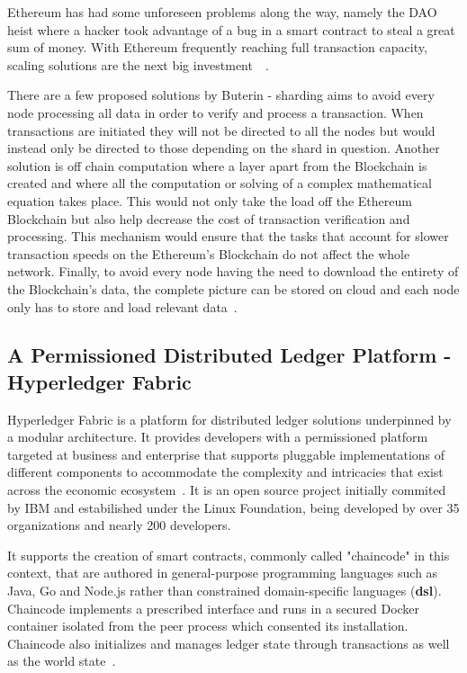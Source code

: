Ethereum has had some unforeseen problems along the way, namely the DAO heist where a hacker took advantage of a bug in a smart contract to steal a great sum of money. With Ethereum frequently reaching full transaction capacity, scaling solutions are the next big investment~~\cite{ethereumScalability2018}.

 There are a few proposed solutions by Buterin - sharding aims to avoid every node processing all data in order to verify and process a transaction. When transactions are initiated they will not be directed to all the nodes but would instead only be directed to those depending on the shard in question. Another solution is off chain computation where a layer apart from the Blockchain is created and where all the computation or solving of a complex mathematical equation takes place. This would not only take the load off the Ethereum Blockchain but also help decrease the cost of transaction verification and processing. This mechanism would ensure that the tasks that account for slower transaction speeds on the Ethereum’s Blockchain do not affect the whole network. Finally, to avoid every node having the need to download the entirety of the Blockchain's data, the complete picture can be stored on cloud and each node only has to store and load relevant data~\cite{ethereumBlogScalability2018}.

\subsection{A Permissioned Distributed Ledger Platform - Hyperledger Fabric}

Hyperledger Fabric is a platform for distributed ledger solutions underpinned by a modular architecture. It provides developers with a permissioned platform targeted at business and enterprise that supports pluggable implementations of different components to accommodate the complexity and intricacies that exist across the economic ecosystem~\cite{HyperledgerFabricDocs2017}. It is an open source project initially commited by IBM  and estabilished under the Linux Foundation, being developed by over 35 organizations and nearly 200 developers.

It supports the creation of smart contracts, commonly called "chaincode" in this context, that are authored in general-purpose programming languages such as Java, Go and Node.js rather than constrained domain-specific languages (\textbf{dsl}). Chaincode implements a prescribed interface and runs in a secured Docker container isolated from the peer process which consented its installation. Chaincode also initializes and manages ledger state through transactions as well as the world state~\cite{HyperledgerFabricDocs2017}.


